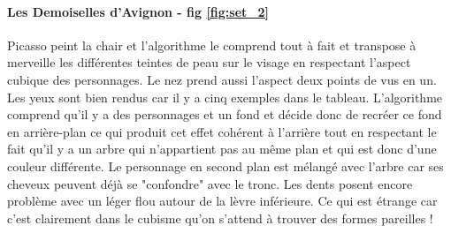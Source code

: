 \documentclass{article}
\begin{document}
\paragraph*{Les Demoiselles d'Avignon - fig \ref{fig:set_2}} Picasso peint la chair et l'algorithme le comprend tout à fait et transpose à merveille les différentes teintes de peau sur le visage en respectant l'aspect cubique des personnages. Le nez prend aussi l'aspect deux points de vus en un. Les yeux sont bien rendus car il y a cinq exemples dans le tableau. L'algorithme comprend qu'il y a des personnages et un fond et décide donc de recréer ce fond en arrière-plan ce qui produit cet effet cohérent à l'arrière tout en respectant le fait qu'il y a un arbre qui n'appartient pas au même plan et qui est donc d'une couleur différente. Le personnage en second plan est mélangé avec l'arbre car ses cheveux peuvent déjà se "confondre" avec le tronc. Les dents posent encore problème avec un léger flou autour de la lèvre inférieure. Ce qui est étrange car c'est clairement dans le cubisme qu'on s'attend à trouver des formes pareilles ! 
\end{document}
